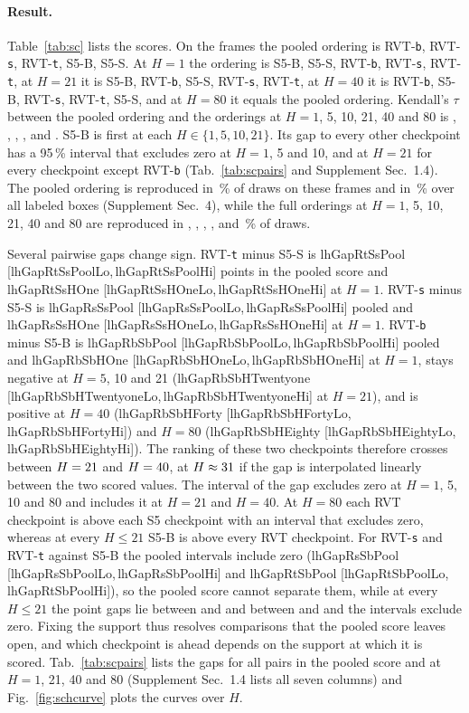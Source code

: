 \documentclass[10pt,twocolumn,letterpaper]{article}
\newcommand{\lhgap}[3]{\csname lhGap#1#2#3\endcsname{} [\csname lhGap#1#2#3Lo\endcsname,\,\csname lhGap#1#2#3Hi\endcsname]}
\begin{document}
\paragraph{Result.}
Table~\ref{tab:sc} lists the scores. On the \lhNFrames{} frames the pooled ordering is RVT-\texttt{b}, RVT-\texttt{s}, RVT-\texttt{t}, S5-B, S5-S. At $H=1$ the ordering is S5-B, S5-S, RVT-\texttt{b}, RVT-\texttt{s}, RVT-\texttt{t}, at $H=21$ it is S5-B, RVT-\texttt{b}, S5-S, RVT-\texttt{s}, RVT-\texttt{t}, at $H=40$ it is RVT-\texttt{b}, S5-B, RVT-\texttt{s}, RVT-\texttt{t}, S5-S, and at $H=80$ it equals the pooled ordering. Kendall's $\tau$ between the pooled ordering and the orderings at $H=1$, 5, 10, 21, 40 and 80 is \lhTauHOne{}, \lhTauHFive{}, \lhTauHTen{}, \lhTauHTwentyone{}, \lhTauHForty{} and \lhTauHEighty{}. S5-B is first at each $H\in\{1,5,10,21\}$. Its gap to every other checkpoint has a 95\,\% interval that excludes zero at $H=1$, 5 and 10, and at $H=21$ for every checkpoint except RVT-\texttt{b} (Tab.~\ref{tab:scpairs} and Supplement Sec.~1.4). The pooled ordering is reproduced in \lhReproPool\,\% of draws on these frames and in \rankHoldBox\,\% over all labeled boxes (Supplement Sec.~4), while the full orderings at $H=1$, 5, 10, 21, 40 and 80 are reproduced in \lhReproHOne, \lhReproHFive, \lhReproHTen, \lhReproHTwentyone, \lhReproHForty{} and \lhReproHEighty\,\% of draws.

Several pairwise gaps change sign. RVT-\texttt{t} minus S5-S is \lhgap{Rt}{Ss}{Pool} points in the pooled score and \lhgap{Rt}{Ss}{HOne} at $H=1$. RVT-\texttt{s} minus S5-S is \lhgap{Rs}{Ss}{Pool} pooled and \lhgap{Rs}{Ss}{HOne} at $H=1$. RVT-\texttt{b} minus S5-B is \lhgap{Rb}{Sb}{Pool} pooled and \lhgap{Rb}{Sb}{HOne} at $H=1$, stays negative at $H=5$, 10 and 21 (\lhgap{Rb}{Sb}{HTwentyone} at $H=21$), and is positive at $H=40$ (\lhgap{Rb}{Sb}{HForty}) and $H=80$ (\lhgap{Rb}{Sb}{HEighty}). The ranking of these two checkpoints therefore crosses between $H=21$ and $H=40$, at $H\approx31$ if the gap is interpolated linearly between the two scored values. The interval of the gap excludes zero at $H=1$, 5, 10 and 80 and includes it at $H=21$ and $H=40$. At $H=80$ each RVT checkpoint is above each S5 checkpoint with an interval that excludes zero, whereas at every $H\le21$ S5-B is above every RVT checkpoint. For RVT-\texttt{s} and RVT-\texttt{t} against S5-B the pooled intervals include zero (\lhgap{Rs}{Sb}{Pool} and \lhgap{Rt}{Sb}{Pool}), so the pooled score cannot separate them, while at every $H\le21$ the point gaps lie between \lhGapRsSbMin{} and \lhGapRsSbMax{} and between \lhGapRtSbMin{} and \lhGapRtSbMax{} and the intervals exclude zero. Fixing the support thus resolves comparisons that the pooled score leaves open, and which checkpoint is ahead depends on the support at which it is scored. Tab.~\ref{tab:scpairs} lists the gaps for all pairs in the pooled score and at $H=1$, 21, 40 and 80 (Supplement Sec.~1.4 lists all seven columns) and Fig.~\ref{fig:schcurve} plots the curves over $H$.
\end{document}
